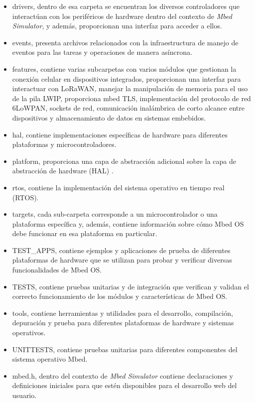 \begin{itemize}

	\item drivers, dentro de esa carpeta se encuentran los diversos controladores que interactúan con los periféricos de hardware dentro del contexto de \textit{Mbed Simulator}, y además, proporcionan una interfaz para acceder a ellos. 
	
	\item events, presenta archivos relacionados con la infraestructura de manejo de eventos para las tareas y operaciones de manera asíncrona.

	\item features, contiene varias subcarpetas con varios módulos que gestionan la conexión celular en dispositivos integrados, proporcionan una interfaz para interactuar con LoRaWAN, manejar la manipulación de memoria para el uso de la pila LWIP, proporciona mbed TLS, implementación del protocolo de red 6LoWPAN, sockets de red, comunicación inalámbrica de corto alcance entre dispositivos y almacenamiento de datos en sistemas embebidos. 
	
	\item hal, contiene implementaciones específicas de hardware para diferentes plataformas y microcontroladores.  
	
	\item platform, proporciona una capa de abstracción adicional sobre la capa de abstracción de hardware (HAL) .
	
	\item rtos, contiene la implementación del sistema operativo en tiempo real (RTOS).
	
	\item targets, cada sub-carpeta corresponde a un microcontrolador o una plataforma específica y, además, contiene información sobre cómo Mbed OS debe funcionar en esa plataforma en particular.
	
	\item TEST\_APPS, contiene ejemplos y aplicaciones de prueba de diferentes plataformas de hardware que se utilizan para probar y verificar diversas funcionalidades de Mbed OS.
	
	\item TESTS, contiene pruebas unitarias y de integración que verifican y validan el correcto funcionamiento de los módulos y características de Mbed OS.
	
	\item tools, contiene herramientas y utilidades para el desarrollo, compilación, depuración y prueba para diferentes plataformas de hardware y sistemas operativos.

	\item UNITTESTS, contiene pruebas unitarias para diferentes componentes del sistema operativo Mbed.

	\item mbed.h, dentro del contexto de \textit{Mbed Simulator} contiene declaraciones y definiciones iniciales para que estén disponibles para el desarrollo web del usuario. 
	
\end{itemize}


